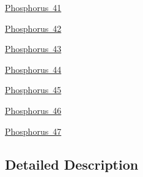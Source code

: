 \begin{DoxyCompactItemize}
\mbox{\hyperlink{group___isotope_const-_phosphorus-_p41}{Phosphorus 41}}
\item 
\mbox{\hyperlink{group___isotope_const-_phosphorus-_p42}{Phosphorus 42}}
\item 
\mbox{\hyperlink{group___isotope_const-_phosphorus-_p43}{Phosphorus 43}}
\item 
\mbox{\hyperlink{group___isotope_const-_phosphorus-_p44}{Phosphorus 44}}
\item 
\mbox{\hyperlink{group___isotope_const-_phosphorus-_p45}{Phosphorus 45}}
\item 
\mbox{\hyperlink{group___isotope_const-_phosphorus-_p46}{Phosphorus 46}}
\item 
\mbox{\hyperlink{group___isotope_const-_phosphorus-_p47}{Phosphorus 47}}
\end{DoxyCompactItemize}


\subsection{Detailed Description}

